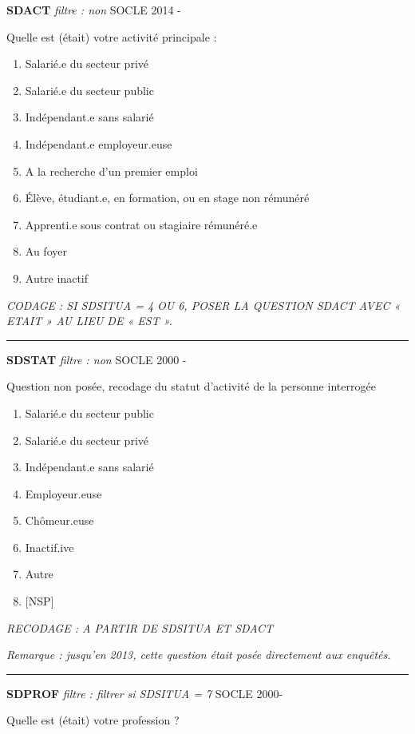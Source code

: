 \documentclass[12pt,a4paper]{reedthesis}
\providecommand{\tightlist}{%
  \setlength{\itemsep}{0pt}\setlength{\parskip}{0pt}}
\begin{document}
\textbf{SDACT} \emph{filtre : non} SOCLE 2014 -

Quelle est (était) votre activité principale :
\begin{enumerate}
\def\labelenumi{\arabic{enumi}.}
\tightlist
\item
  Salarié.e du secteur privé
\item
  Salarié.e du secteur public
\item
  Indépendant.e sans salarié
\item
  Indépendant.e employeur.euse
\item
  A la recherche d'un premier emploi
\item
  Élève, étudiant.e, en formation, ou en stage non rémunéré
\item
  Apprenti.e sous contrat ou stagiaire rémunéré.e
\item
  Au foyer
\item
  Autre inactif
\end{enumerate}
\emph{CODAGE : SI SDSITUA = 4 OU 6, POSER LA QUESTION SDACT AVEC « ETAIT » AU LIEU DE « EST ».}
\begin{center}\rule{0.5\linewidth}{0.5pt}\end{center}

\textbf{SDSTAT} \emph{filtre : non} SOCLE 2000 -

Question non posée, recodage du statut d'activité de la personne interrogée
\begin{enumerate}
\def\labelenumi{\arabic{enumi}.}
\tightlist
\item
  Salarié.e du secteur public
\item
  Salarié.e du secteur privé
\item
  Indépendant.e sans salarié
\item
  Employeur.euse
\item
  Chômeur.euse
\item
  Inactif.ive
\item
  Autre
\item
  {[}NSP{]}
\end{enumerate}
\emph{RECODAGE : A PARTIR DE SDSITUA ET SDACT}

\emph{Remarque : jusqu'en 2013, cette question était posée directement aux enquêtés.}
\begin{center}\rule{0.5\linewidth}{0.5pt}\end{center}

\textbf{SDPROF} \emph{filtre : filtrer si SDSITUA = 7} SOCLE 2000-

Quelle est (était) votre profession ?
\end{document}
